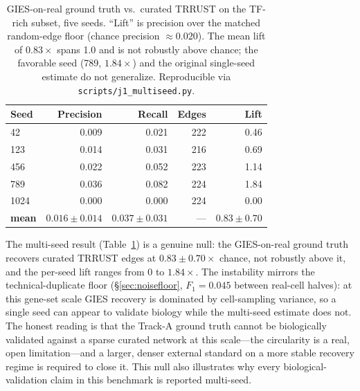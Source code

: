 \documentclass{article}
\theoremstyle{plain}
\theoremstyle{definition}
\theoremstyle{remark}
\begin{document}
\begin{table}[h]
\centering
\small
\begin{tabular}{lrrrr}
\toprule
\textbf{Seed} & \textbf{Precision} & \textbf{Recall} & \textbf{Edges} & \textbf{Lift} \\
\midrule
42   & 0.009 & 0.021 & 222 & 0.46 \\
123  & 0.014 & 0.031 & 216 & 0.69 \\
456  & 0.022 & 0.052 & 223 & 1.14 \\
789  & 0.036 & 0.082 & 224 & 1.84 \\
1024 & 0.000 & 0.000 & 224 & 0.00 \\
\midrule
\textbf{mean} & $0.016 \pm 0.014$ & $0.037 \pm 0.031$ & --- & $\mathbf{0.83 \pm 0.70}$ \\
\bottomrule
\end{tabular}
\caption{GIES-on-real ground truth vs.\ curated TRRUST on the TF-rich subset, five seeds. ``Lift'' is precision over the matched random-edge floor (chance precision $\approx 0.020$). The mean lift of $0.83\times$ spans 1.0 and is not robustly above chance; the favorable seed (789, $1.84\times$) and the original single-seed estimate do not generalize. Reproducible via \texttt{scripts/j1\_multiseed.py}.}
\label{tab:trrust_multiseed}
\end{table}

The multi-seed result (Table~\ref{tab:trrust_multiseed}) is a genuine null: the GIES-on-real ground truth recovers curated TRRUST edges at $0.83 \pm 0.70\times$ chance, not robustly above it, and the per-seed lift ranges from $0$ to $1.84\times$. The instability mirrors the technical-duplicate floor (\S\ref{sec:noisefloor}, $F_1 = 0.045$ between real-cell halves): at this gene-set scale GIES recovery is dominated by cell-sampling variance, so a single seed can appear to validate biology while the multi-seed estimate does not. The honest reading is that the Track-A ground truth cannot be biologically validated against a sparse curated network at this scale---the circularity is a real, open limitation---and a larger, denser external standard on a more stable recovery regime is required to close it. This null also illustrates why every biological-validation claim in this benchmark is reported multi-seed.
\end{document}
